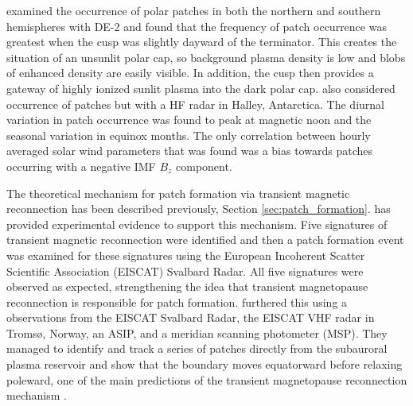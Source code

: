 \citet{Coley1998} examined the occurrence of polar patches in both the northern and southern hemispheres with DE-2 and found that the frequency of patch occurrence was greatest when  the cusp was slightly dayward of the terminator.  This creates the situation of an unsunlit polar cap, so background plasma density is low and blobs of enhanced density are easily visible.  In addition, the cusp then provides a gateway of highly ionized sunlit plasma into the dark polar cap.  \citet{Rodger1996} also considered occurrence of patches but with a HF radar in Halley, Antarctica.  The diurnal variation in patch occurrence was found to peak at magnetic noon and the seasonal variation in equinox months.  The only correlation between hourly averaged solar wind parameters that was found was a bias towards patches occurring with a negative IMF \(B_z\) component.

The theoretical mechanism for patch formation via transient magnetic reconnection has been described previously, Section \ref{sec:patch_formation}.  \citet{Carlson2004} has provided experimental evidence to support this mechanism.  Five signatures of transient magnetic reconnection were identified and then a patch formation event was examined for these signatures using the European Incoherent Scatter Scientific Association (EISCAT) Svalbard Radar.  All five signatures were observed as expected, strengthening the idea that transient magnetopause reconnection is responsible for patch formation.  \citet{Carlson2006} furthered this using a observations from the EISCAT Svalbard Radar, the EISCAT VHF radar in Troms\o, Norway, an ASIP, and a meridian scanning photometer (MSP).  They managed to identify and track a series of patches directly from the subauroral plasma reservoir and show that the boundary moves equatorward before relaxing poleward, one of the main predictions of the transient magnetopause reconnection mechanism \citep{Lockwood1992}.

